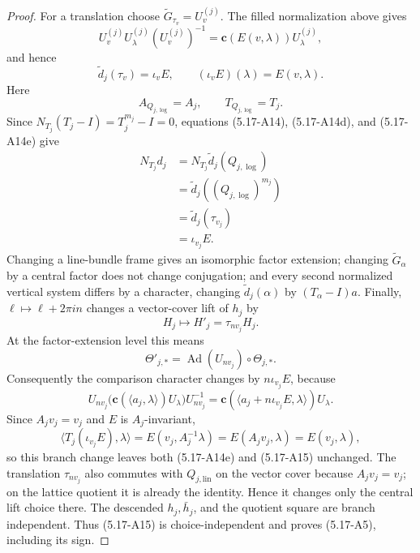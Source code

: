 \begin{proof}
For a translation choose
\(\widetilde G_{\tau_v}=U_v^{(j)}\).  The filled normalization above gives
\[
 U_v^{(j)}U_\lambda^{(j)}(U_v^{(j)})^{-1}
 =\mathbf c(E(v,\lambda))U_\lambda^{(j)},
\]
and hence
\[
 \widetilde d_j(\tau_v)=\iota_vE,\qquad
 (\iota_vE)(\lambda)=E(v,\lambda).
\tag{5.17-A14f}
\]
Here
\[
 A_{Q_{j,\log}}=A_j,\qquad T_{Q_{j,\log}}=T_j.
\]
Since \(N_{T_j}(T_j-I)=T_j^{m_j}-I=0\), equations
(5.17-A14), (5.17-A14d), and (5.17-A14e) give
\[
\begin{aligned}
 N_{T_j}d_j
 &=N_{T_j}\widetilde d_j(Q_{j,\log})\\
 &=\widetilde d_j((Q_{j,\log})^{m_j})\\
 &=\widetilde d_j(\tau_{v_j})\\
 &=\iota_{v_j}E.
\end{aligned}
\tag{5.17-A15}
\]
Changing a line-bundle frame gives an isomorphic factor extension; changing
\(\widetilde G_\alpha\) by a central factor does not change conjugation; and
every second normalized vertical system differs by a character, changing
\(\widetilde d_j(\alpha)\) by \((T_\alpha-I)a\).  Finally,
\(\ell\mapsto\ell+2\pi in\) changes a vector-cover lift of \(h_j\) by
\[
 H_j\longmapsto H'_j=\tau_{nv_j}H_j.
\]
At the factor-extension level this means
\[
 \Theta'_{j,*}
 =\operatorname{Ad}(U_{nv_j})\circ\Theta_{j,*}.
\]
Consequently the comparison character changes by
\(n\iota_{v_j}E\), because
\[
 U_{nv_j}
 \bigl(\mathbf c(\langle a_j,\lambda\rangle)U_\lambda\bigr)
 U_{nv_j}^{-1}
 =
 \mathbf c(\langle a_j+n\iota_{v_j}E,\lambda\rangle)U_\lambda.
\]
Since \(A_jv_j=v_j\) and \(E\) is \(A_j\)-invariant,
\[
 \langle T_j(\iota_{v_j}E),\lambda\rangle
 =E(v_j,A_j^{-1}\lambda)
 =E(A_jv_j,\lambda)
 =E(v_j,\lambda),
\]
so this branch change leaves both (5.17-A14e) and (5.17-A15) unchanged.
The translation \(\tau_{nv_j}\) also commutes with
\(Q_{j,\mathrm{lin}}\) on the vector cover because \(A_jv_j=v_j\); on the
lattice quotient it is already the identity.  Hence it changes only the
central lift choice there.
The descended \(h_j,\bar h_j\), and the quotient square are branch
independent.  Thus (5.17-A15) is choice-independent and proves (5.17-A5),
including its sign.


\end{proof}
